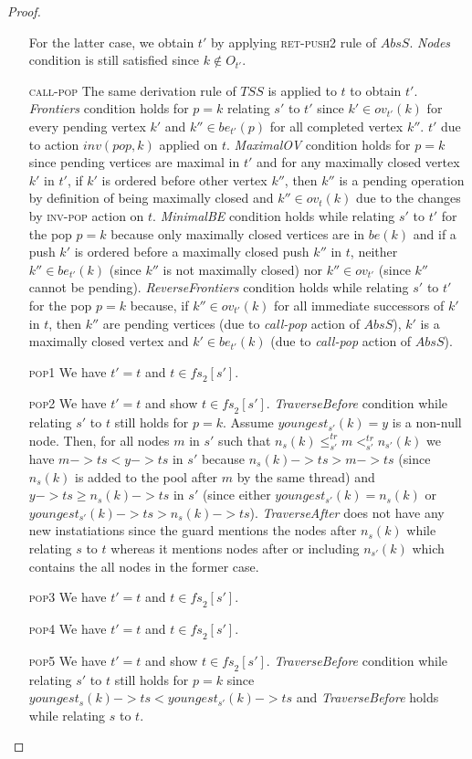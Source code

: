 \begin{proof}
\begin{itemize}
For the latter case, we obtain $t'$ by applying \textsc{ret-push2} rule of $AbsS$. \emph{Nodes} condition is still satisfied since $k \notin O_{t'}$. 
\item[\textsc{call-pop}] The same derivation rule of $TSS$ is applied to $t$  to obtain $t'$. \emph{Frontiers} condition holds for $p = k$ relating $s'$ to $t'$ since $k' \in ov_{t'}(k)$ for every pending vertex $k'$ and $k'' \in be_{t'}(p)$ for all completed vertex $k''$. $t'$ due to action $inv(pop,k)$ applied on $t$. \emph{MaximalOV} condition holds for $p = k$ since pending vertices are maximal in $t'$ and for any maximally closed vertex $k'$ in $t'$, if $k'$ is ordered before other vertex $k''$, then $k''$ is a pending operation by definition of being maximally closed and $k'' \in ov_t(k)$ due to the changes by \textsc{inv-pop} action on $t$. \emph{MinimalBE} condition holds while relating $s'$ to $t'$ for the pop $ p = k$ because only maximally closed vertices are in $be(k)$ and if a push $k'$ is ordered before a maximally closed push $k''$ in $t$, neither $k'' \in be_{t'}(k)$ (since $k''$ is not maximally closed) nor $k'' \in ov_{t'}$ (since $k''$ cannot be pending). \emph{ReverseFrontiers} condition holds while relating $s'$ to $t'$ for the pop $p=k$ because, if $k'' \in ov_{t'}(k)$ for all immediate successors of $k'$ in $t$, then $k'' $ are pending vertices (due to \emph{call-pop} action of $AbsS$), $k'$ is a maximally closed vertex and $k' \in be_{t'}(k)$ (due to \emph{call-pop} action of $AbsS$).
\item[\textsc{pop1}]We have $t' = t$ and $t \in \mathit{fs}_2[s']$.
\item[\textsc{pop2}]We have $t' = t$ and show $t \in \mathit{fs}_2[s']$. \emph{TraverseBefore} condition while relating $s'$ to $t$ still holds for $p=k$. Assume $youngest_{s'}(k) = y$ is a non-null node. Then, for all nodes $m$ in $s'$ such that $n_s(k) \leq^{tr}_{s'} m <^{tr}_{s'} n_{s'}(k)$ we have $m->ts < y->ts$ in $s'$ because  $n_s(k)->ts > m->ts$ (since $n_s(k)$ is added to the pool after $m$ by the same thread) and $y->ts \geq n_s(k)->ts$ in $s'$ (since either $youngest_{s'}(k) = n_s(k)$ or $youngest_{s'}(k)->ts > n_s(k)->ts$). \emph{TraverseAfter} does not have any new instatiations since the guard mentions the nodes after $n_s(k)$ while relating $s$ to $t$ whereas it mentions nodes after or including $n_{s'}(k)$ which contains the all nodes in the former case.
\item[\textsc{pop3}]We have $t' = t$ and $t \in \mathit{fs}_2[s']$.
\item[\textsc{pop4}]We have $t' = t$ and $t \in \mathit{fs}_2[s']$.
\item[\textsc{pop5}]We have $t' = t$ and show $t \in \mathit{fs}_2[s']$. 
\emph{TraverseBefore} condition while relating $s'$ to $t$ still holds for $p=k$ since $youngest_s(k)->ts < youngest_{s'}(k)->ts$ and \emph{TraverseBefore} holds while relating $s$ to $t$. 


\end{itemize}
\end{proof}
